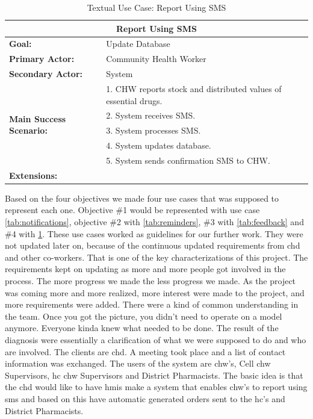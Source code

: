 \begin{table}
	\centering
	\begin{tabular}{|p{5cm}|p{7cm}|}
		\hline
		\multicolumn{2}{|c|}{\textbf{Report Using SMS}}\\
		\hline
		\textbf{Goal:} & Update Database \\
		\hline
		\textbf{Primary Actor:} & Community Health Worker\\
		\hline
		\textbf{Secondary Actor:} & System \\
		\hline
		\multirow{5}{*}{\textbf{Main Success Scenario:}}	& 1. CHW reports stock and distributed values of essential drugs. \\
																											& 2. System receives SMS. \\
																											& 3. System processes SMS. \\
																											& 4. System updates database. \\
																											& 5. System sends confirmation SMS to CHW. \\
		\hline
		\textbf{Extensions:} & \\
		\hline
	\end{tabular}
	\caption{Textual Use Case: Report Using SMS}
	\label{tab:smsreport}
\end{table}

Based on the four objectives we made four use cases that was supposed to represent each one. Objective \#1 would be represented with use case \ref{tab:notifications}, objective \#2 with \ref{tab:reminders}, \#3 with \ref{tab:feedback} and \#4 with \ref{tab:smsreport}. These use cases worked as guidelines for our further work. They were not updated later on, because of the continuous updated requirements from \gls{chd} and other co-workers. That is one of the key characterizations of this project. The requirements kept on updating as more and more people got involved in the process. The more progress we made the less progress we made. As the project was coming more and more realized, more interest were made to the project, and more requirements were added. There were a kind of common understanding in the team. Once you got the picture, you didn't need to operate on a model anymore. Everyone kinda knew what needed to be done. The result of the diagnosis were essentially a clarification of what we were supposed to do and who are involved. The clients are \gls{chd}. A meeting took place and a list of contact information was exchanged. The users of the system are \gls{chw}'s, Cell \gls{chw} Supervisors, \gls{hc} \gls{chw} Supervisors and District Pharmacists. The basic idea is that the \gls{chd} would like to have \gls{hmis} make a system that enables \gls{chw}'s to report using \gls{sms} and based on this have automatic generated orders sent to the \gls{hc}'s and District Pharmacists.

